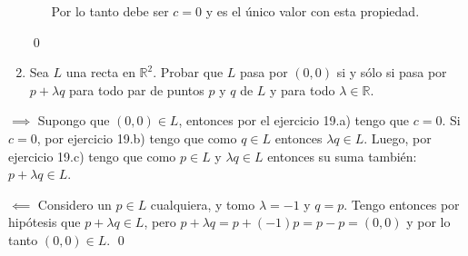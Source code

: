 \begin{enumerate}[resume,topsep=6pt, itemsep=.4cm]
\begin{enumerate}
Por lo tanto debe ser $c=0$ y es el único valor con esta propiedad.
\end{enumerate}

\qed

\item Sea $L$ una recta en $\mathbb{R}^2$. Probar que $L$ pasa por $(0,0)$ si y sólo si pasa por $p+\lambda q$ para todo par de puntos $p$ y $q$ de $L$ y para todo $\lambda\in\mathbb{R}$.
\end{enumerate}

\rta 

$\boxed{ \implies }$ Supongo que $(0,0) \in L$, entonces por el ejercicio 19.a) tengo que $c=0$. Si $c=0$, por ejercicio 19.b) tengo que como $q \in L$ entonces $\lambda q \in L$. Luego, por ejercicio 19.c) tengo que como $p \in L$ y $\lambda q \in L$ entonces su suma también: $p + \lambda q \in L$.

$\boxed{ \impliedby }$ Considero un $p \in L$ cualquiera, y tomo $\lambda = -1$ y $q = p$. Tengo entonces por hipótesis que $p + \lambda q \in L$, pero $p + \lambda q = p + (-1) p = p - p = (0,0)$ y por lo tanto $(0,0) \in L$. \qed

